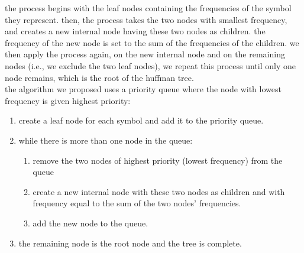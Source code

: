 \documentclass[a4paper,12pt]{article}
\begin{document}
the process begins with the leaf nodes containing the frequencies of the symbol they represent. then, the process takes the two nodes with smallest frequency, and creates a new internal node having these two nodes as children. the frequency of the new node is set to the sum of the frequencies of the children. we then apply the process again, on the new internal node and on the remaining nodes (i.e., we exclude the two leaf nodes), we repeat this process until only one node remains, which is the root of the huffman tree.\\
the algorithm we proposed uses a priority queue where the node with lowest frequency is given highest priority:\\
\begin{enumerate}
\item create a leaf node for each symbol and add it to the priority queue.\\
\item while there is more than one node in the queue:\\
\begin{enumerate}
\item remove the two nodes of highest priority (lowest frequency) from the queue\\
\item create a new internal node with these two nodes as children and with frequency equal to the sum of the two nodes' frequencies.\\
\item add the new node to the queue.\\
\end{enumerate}
\item the remaining node is the root node and the tree is complete.
\end{enumerate}
\end{document}
